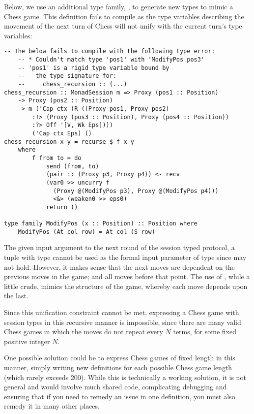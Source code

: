 Below, we use an additional type family, , to generate new  types to mimic a Chess game. This definition fails to compile as the type variables describing the movement of the next turn of Chess will not unify with the current turn's type variables:

\begin{lstlisting}
-- The below fails to compile with the following type error:
    -- * Couldn't match type 'pos1' with 'ModifyPos pos3'
    -- 'pos1' is a rigid type variable bound by
    --   the type signature for:
    --     chess_recursion :: (...)
chess_recursion :: MonadSession m => Proxy (pos1 :: Position)
    -> Proxy (pos2 :: Position)
    -> m ('Cap ctx (R ((Proxy pos1, Proxy pos2)
        :!> (Proxy (pos3 :: Position), Proxy (pos4 :: Position))
        :?> Off '[V, Wk Eps])))
        ('Cap ctx Eps) ()
chess_recursion x y = recurse $ f x y
    where
        f from to = do
            send (from, to)
            (pair :: (Proxy p3, Proxy p4)) <- recv
            (var0 >> uncurry f
              (Proxy @(ModifyPos p3), Proxy @(ModifyPos p4)))
              <&> (weaken0 >> eps0)
            return ()

type family ModifyPos (x :: Position) :: Position where
    ModifyPos (At col row) = At col (S row)
\end{lstlisting}

The given input argument to the next round of the session typed protocol, a tuple with type  cannot be used as the formal input parameter of type  since  may not hold. However, it makes sense that the next moves are dependent on the previous moves in the game; and all moves before that point. The use of , while a little crude, mimics the structure of the game, whereby each move depends upon the last.

Since this unification constraint cannot be met, expressing a Chess game with session types in this recursive manner is impossible, since there are many valid Chess games in which the moves do not repeat every $N$ terms, for some fixed positive integer $N$.

One possible solution could be to express Chess games of fixed length in this manner, simply writing new definitions for each possible Chess game length (which rarely exceeds 200). While this is technically a working solution, it is not general and would involve much shared code, complicating debugging and ensuring that if you need to remedy an issue in one definition, you must also remedy it in many other places.

